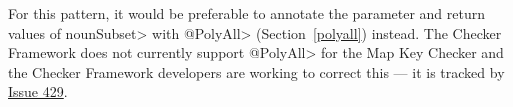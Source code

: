 For this pattern, it would be preferable to annotate the parameter and return
values of \<nounSubset> with \<@PolyAll> (Section~\ref{polyall}) instead.
The Checker Framework does not currently support \<@PolyAll> for the
Map Key Checker and the Checker Framework developers are working to
correct this --- it is tracked by
\href{http://code.google.com/p/checker-framework/issues/detail?id=429}{Issue 429}.

